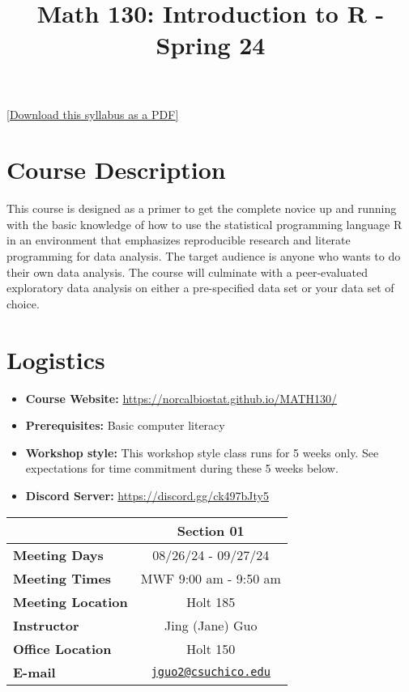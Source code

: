 \documentclass[
  11pt,
]{article}
\title{Math 130: Introduction to R - Spring 24}
\author{}
\date{\vspace{-2.5em}}
\providecommand{\tightlist}{%
  \setlength{\itemsep}{0pt}\setlength{\parskip}{0pt}}
\begin{document}
\maketitle

\href{syllabus.pdf}{{[}Download this syllabus as a PDF{]}}

\section{Course Description}\label{course-description}

This course is designed as a primer to get the complete novice up and
running with the basic knowledge of how to use the statistical
programming language R in an environment that emphasizes reproducible
research and literate programming for data analysis. The target audience
is anyone who wants to do their own data analysis. The course will
culminate with a peer-evaluated exploratory data analysis on either a
pre-specified data set or your data set of choice.

\section{Logistics}\label{logistics}

\begin{itemize}
\tightlist
\item
  \textbf{Course Website:}
  \url{https://norcalbiostat.github.io/MATH130/}
\item
  \textbf{Prerequisites:} Basic computer literacy
\item
  \textbf{Workshop style:} This workshop style class runs for 5 weeks
  only. See expectations for time commitment during these 5 weeks
  below.\\
\item
  \textbf{Discord Server:} \url{https://discord.gg/ck497bJty5}
\end{itemize}

\begin{longtable}[]{@{}lc@{}}
\toprule\noalign{}
& Section 01 \\
\midrule\noalign{}
\endhead
\bottomrule\noalign{}
\endlastfoot
\textbf{Meeting Days} & 08/26/24 - 09/27/24 \\
\textbf{Meeting Times} & MWF 9:00 am - 9:50 am \\
\textbf{Meeting Location} & Holt 185 \\
\textbf{Instructor} & Jing (Jane) Guo \\
\textbf{Office Location} & Holt 150 \\
\textbf{E-mail} &
\href{mailto:jguo2@csuchico.edu}{\nolinkurl{jguo2@csuchico.edu}} \\
\end{longtable}
\end{document}
